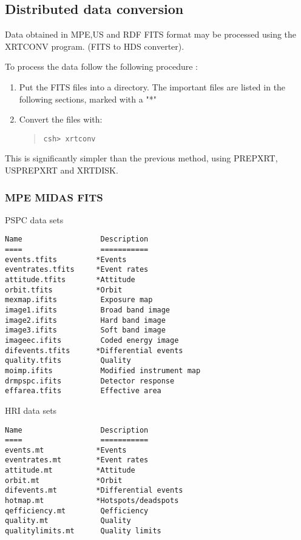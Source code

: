 \documentclass{book}
\renewcommand{\_}{{\tt\char'137}}     %
\begin{document}
\subsection{Distributed data conversion}
Data obtained in MPE,US and RDF FITS format may be processed
using the XRTCONV program. (FITS to HDS converter).
 
To process the data follow the following procedure :
 
\begin{enumerate}
\item Put the FITS files into a directory. The important files are listed
in the following sections, marked with a "*"
\item Convert the files with:
\begin{quote}\begin{verbatim}
csh> xrtconv
\end{verbatim}\end{quote}
\end{enumerate}
This is significantly simpler than the previous method, using
PREPXRT, USPREPXRT and XRTDISK.
 
\subsubsection{MPE MIDAS FITS}
PSPC data sets
\begin{verbatim}
Name                  Description
====                  ===========
events.tfits         *Events
eventrates.tfits     *Event rates
attitude.tfits       *Attitude
orbit.tfits          *Orbit
mexmap.ifits          Exposure map
image1.ifits          Broad band image
image2.ifits          Hard band image
image3.ifits          Soft band image
imageec.ifits         Coded energy image
difevents.tfits      *Differential events
quality.tfits         Quality
moimp.ifits           Modified instrument map
drmpspc.ifits         Detector response
effarea.tfits         Effective area
\end{verbatim}
HRI data sets
\begin{verbatim}
Name                  Description
====                  ===========
events.mt            *Events
eventrates.mt        *Event rates
attitude.mt          *Attitude
orbit.mt             *Orbit
difevents.mt         *Differential events
hotmap.mt            *Hotspots/deadspots
qefficiency.mt        Qefficiency
quality.mt            Quality
qualitylimits.mt      Quality limits
\end{verbatim}
\end{document}
